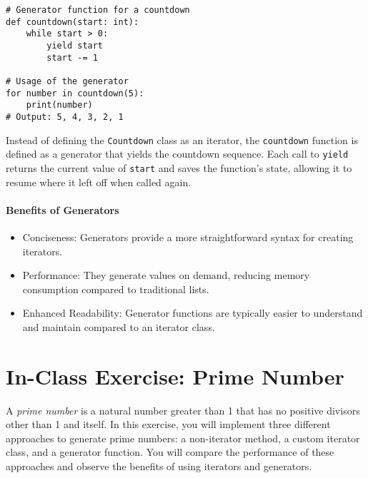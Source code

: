 \documentclass[oneside,11pt,dvipsnames]{book}
\newcommand{\code}[1]{\texttt{#1}}
\begin{document}
\begin{lstlisting}
# Generator function for a countdown
def countdown(start: int):
    while start > 0:
        yield start
        start -= 1

# Usage of the generator
for number in countdown(5):
    print(number)
# Output: 5, 4, 3, 2, 1
\end{lstlisting}

Instead of defining the \code{Countdown} class as an iterator, the \code{countdown} function is defined as a generator that yields the countdown sequence.
Each call to \code{yield} returns the current value of \code{start} and saves the function's state, allowing it to resume where it left off when called again.

\paragraph{Benefits of Generators}
\begin{itemize}
    \item Conciseness: Generators provide a more straightforward syntax for creating iterators.
	\item Performance: They generate values on demand, reducing memory consumption compared to traditional lists.
	\item Enhanced Readability: Generator functions are typically easier to understand and maintain compared to an iterator class.    
\end{itemize}   

\section{In-Class Exercise: Prime Number}\label{ex:prime-number}

A \emph{prime number} is a natural number greater than 1 that has no positive divisors other than 1 and itself. In this exercise, you will implement three different approaches to generate prime numbers: a non-iterator method, a custom iterator class, and a generator function. You will compare the performance of these approaches and observe the benefits of using iterators and generators.
\end{document}
